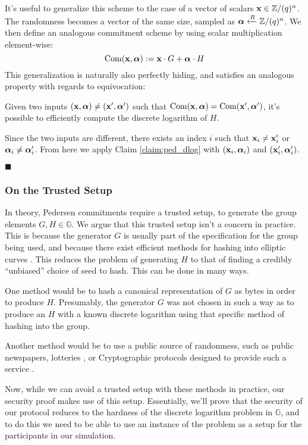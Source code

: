 It's useful to generalize this scheme to the case of a vector of scalars
${\textbf{x} \in \mathbb{Z}/(q)^n}$. The randomness becomes a vector of the same
size, sampled as ${\boldsymbol{\alpha} \xleftarrow{R} \mathbb{Z}/(q)^n}$. We then define
an analogous commitment scheme by using scalar multiplication element-wise:
$$
\text{Com}(\textbf{x}, \boldsymbol{\alpha}) := \textbf{x} \cdot G + \boldsymbol{\alpha} \cdot H
$$
This generalization is naturally also perfectly hiding, and satisfies
an analogous property with regards to equivocation:

\begin{claim}
    \label{claim:ped_vec_dlog}
    Given two inputs $(\textbf{x}, \boldsymbol{\alpha}) \neq (\textbf{x}', \boldsymbol{\alpha}')$ such that
    $\text{Com}(\textbf{x}, \boldsymbol{\alpha}) = \text{Com}(\textbf{x}', \boldsymbol{\alpha}')$, it's possible
    to efficiently compute the discrete logarithm of $H$.
\end{claim}

Since the two inputs are different, there exists an index $i$
such that $\textbf{x}_i \neq \textbf{x}_i'$ or $\boldsymbol{\alpha}_i \neq \boldsymbol{\alpha}_i'$.
From here we apply Claim \ref{claim:ped_dlog} with $(\textbf{x}_i, \boldsymbol{\alpha}_i)$ and
$(\textbf{x}_i', \boldsymbol{\alpha}'_i)$.

$\blacksquare$

\subsubsection{On the Trusted Setup}

In theory, Pedersen commitments require a trusted setup, to generate
the group elements $G, H \in \mathbb{G}$.
We argue that this trusted setup isn't a concern in practice.
This is because the generator $G$
is usually part of the specification for the group being used,
and because there exist
efficient methods for hashing into elliptic curves \cite{icart_how_2009}.
This reduces the problem of generating $H$ to that of finding a credibly
``unbiased'' choice of seed to hash. This can be done in many ways.

One method would be to hash a canonical representation of $G$ as bytes in order
to produce $H$. Presumably, the generator $G$ was not chosen in such
a way as to produce an $H$ with a known discrete logarithm using
that specific method of hashing into the group.

Another method would be to use a public source of randomness,
such as public newspapers, lotteries
\cite{baigneres_trap_2015}, or Cryptographic protocols
designed to provide such a service \cite{fischer_public_2011}.

Now, while we can avoid a trusted setup with these methods in practice,
our security proof makes use of this setup.
Essentially, we'll prove that the security of our protocol reduces
to the hardness of the discrete logarithm problem in $\mathbb{G}$,
and to do this we need to be able to use an instance of the problem
as a setup for the participants in our simulation.


